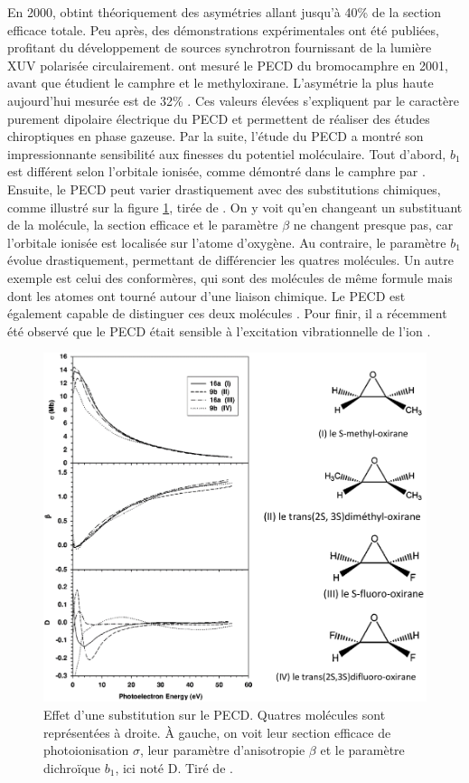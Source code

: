 En 2000,  obtint théoriquement des asymétries allant jusqu'à 40\% de la section efficace totale. Peu après, des démonstrations expérimentales ont été publiées, profitant du développement de sources synchrotron fournissant de la lumière XUV polarisée circulairement.  ont mesuré le PECD du bromocamphre en 2001, avant que  étudient le camphre et  le methyloxirane. L'asymétrie la plus haute aujourd'hui mesurée est de 32\% . Ces valeurs élevées s'expliquent par le caractère purement dipolaire électrique du PECD et permettent de réaliser des études chiroptiques en phase gazeuse.
Par la suite, l'étude du PECD a montré son impressionnante sensibilité aux finesses du potentiel moléculaire. Tout d'abord, $b_1$ est différent selon l'orbitale ionisée, comme démontré dans le camphre par . Ensuite, le PECD peut varier drastiquement avec des substitutions chimiques, comme illustré sur la figure \ref{fig:substitution}, tirée de . On y voit qu'en changeant un substituant de la molécule, la section efficace et le paramètre $\beta$ ne changent presque pas, car l'orbitale ionisée est localisée sur l'atome d'oxygène. Au contraire, le paramètre $b_1$ évolue drastiquement, permettant de différencier les quatres molécules. Un autre exemple est celui des conformères, qui sont des molécules de même formule mais dont les atomes ont tourné autour d'une liaison chimique. Le PECD est également capable de distinguer ces deux molécules . Pour finir, il a récemment été observé que le PECD était sensible à l'excitation vibrationnelle de l'ion .

\begin{figure}[!ht]
\centering
\includegraphics[width=.7\columnwidth]{Figures/PECD/substitution.png}%
\caption{Effet d'une substitution sur le PECD. Quatres molécules sont représentées à droite. \`A gauche, on voit leur section efficace de photoionisation $\sigma$, leur paramètre d'anisotropie $\beta$ et le paramètre dichroïque $b_1$, ici noté D. Tiré de .}
\label{fig:substitution}
\end{figure}

